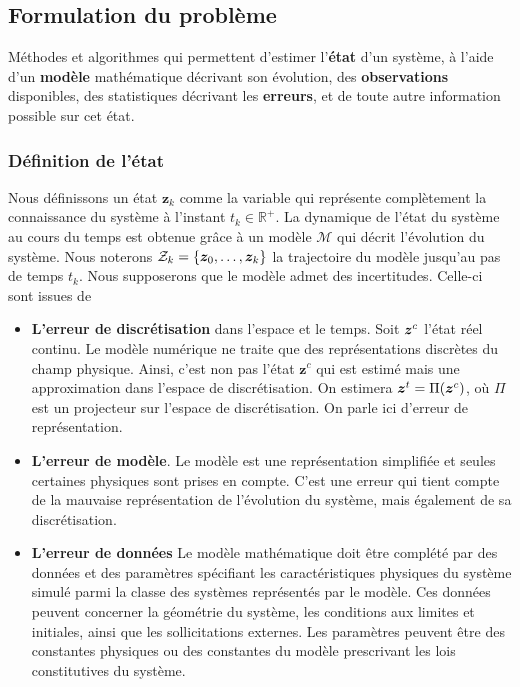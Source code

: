 \subsection{Formulation du problème}

\begin{definition}
    Méthodes et algorithmes qui permettent d’estimer l’\textbf{état} d’un système, à l’aide d’un \textbf{modèle} mathématique décrivant son évolution, des \textbf{observations} disponibles, des statistiques décrivant les \textbf{erreurs}, et de toute autre information possible sur cet état.
\end{definition}

\subsubsection{Définition de l'état}

Nous définissons un état $\bm z_k$ comme la variable qui représente complètement la connaissance du système à l'instant $t_k \in \mathbb R^+$. La dynamique de l'état du système au cours du temps est obtenue grâce à un modèle $\mathcal{M}$ qui décrit l'évolution du système.
Nous noterons $\mathcal Z_k = \{\bm z_0, \dots, \bm z_k\}$ la trajectoire du modèle jusqu'au pas de temps $t_k$.
Nous supposerons que le modèle admet des incertitudes. Celle-ci sont issues de

\begin{itemize}
    \item \textbf{L'erreur de discrétisation} dans l'espace et le temps. Soit $\bm z^c$ l'état réel continu. Le modèle numérique ne traite que des représentations discrètes du champ physique. Ainsi, c'est non pas l'état $\bm z^c$ qui est estimé mais une approximation dans l'espace de discrétisation. On estimera $\bm z^t = \Pi(\bm z^c)$, où $\Pi$ est un projecteur sur l'espace de discrétisation. On parle ici d'erreur de représentation.
    \item \textbf{L'erreur de modèle}. Le modèle est une représentation simplifiée et seules certaines physiques sont prises en compte. C'est une erreur qui tient compte de la mauvaise représentation de l'évolution du système, mais également de sa discrétisation.
    \item \textbf{L'erreur de données} Le modèle mathématique doit être complété par des données et des paramètres spécifiant les caractéristiques physiques du système simulé parmi la classe des systèmes représentés par le modèle. Ces données peuvent concerner la géométrie du système, les conditions aux limites et initiales, ainsi que les sollicitations externes. Les paramètres peuvent être des constantes physiques ou des constantes du modèle prescrivant les lois constitutives du système.
\end{itemize}

